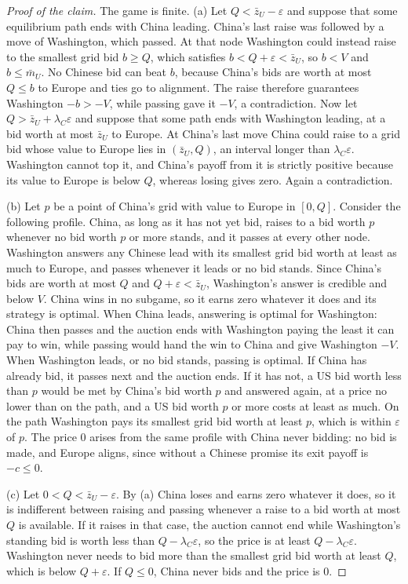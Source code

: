 \begin{proof}[Proof of the claim]
The game is finite. (a) Let $Q<\bar z_U-\varepsilon$ and suppose that some equilibrium path ends with China leading. China's last raise was followed by a move of Washington, which passed. At that node Washington could instead raise to the smallest grid bid $b\ge Q$, which satisfies $b<Q+\varepsilon<\bar z_U$, so $b<V$ and $b\le\bar m_U$. No Chinese bid can beat $b$, because China's bids are worth at most $Q\le b$ to Europe and ties go to alignment. The raise therefore guarantees Washington $-b>-V$, while passing gave it $-V$, a contradiction. Now let $Q>\bar z_U+\lambda_C\varepsilon$ and suppose that some path ends with Washington leading, at a bid worth at most $\bar z_U$ to Europe. At China's last move China could raise to a grid bid whose value to Europe lies in $(\bar z_U,Q)$, an interval longer than $\lambda_C\varepsilon$. Washington cannot top it, and China's payoff from it is strictly positive because its value to Europe is below $Q$, whereas losing gives zero. Again a contradiction.

(b) Let $p$ be a point of China's grid with value to Europe in $[0,Q]$. Consider the following profile. China, as long as it has not yet bid, raises to a bid worth $p$ whenever no bid worth $p$ or more stands, and it passes at every other node. Washington answers any Chinese lead with its smallest grid bid worth at least as much to Europe, and passes whenever it leads or no bid stands. Since China's bids are worth at most $Q$ and $Q+\varepsilon<\bar z_U$, Washington's answer is credible and below $V$. China wins in no subgame, so it earns zero whatever it does and its strategy is optimal. When China leads, answering is optimal for Washington: China then passes and the auction ends with Washington paying the least it can pay to win, while passing would hand the win to China and give Washington $-V$. When Washington leads, or no bid stands, passing is optimal. If China has already bid, it passes next and the auction ends. If it has not, a US bid worth less than $p$ would be met by China's bid worth $p$ and answered again, at a price no lower than on the path, and a US bid worth $p$ or more costs at least as much. On the path Washington pays its smallest grid bid worth at least $p$, which is within $\varepsilon$ of $p$. The price $0$ arises from the same profile with China never bidding: no bid is made, and Europe aligns, since without a Chinese promise its exit payoff is $-c\le 0$.

(c) Let $0<Q<\bar z_U-\varepsilon$. By (a) China loses and earns zero whatever it does, so it is indifferent between raising and passing whenever a raise to a bid worth at most $Q$ is available. If it raises in that case, the auction cannot end while Washington's standing bid is worth less than $Q-\lambda_C\varepsilon$, so the price is at least $Q-\lambda_C\varepsilon$. Washington never needs to bid more than the smallest grid bid worth at least $Q$, which is below $Q+\varepsilon$. If $Q\le 0$, China never bids and the price is $0$.


\end{proof}
